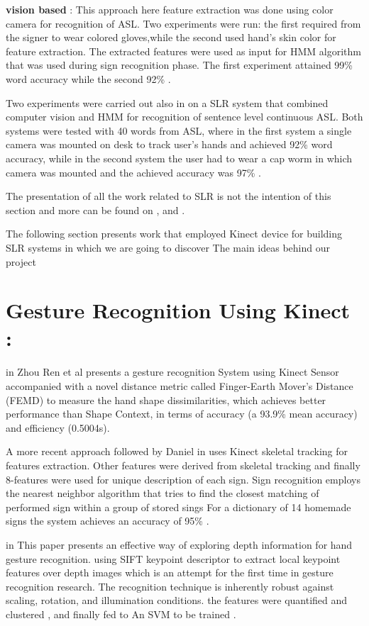 \textbf{vision based }:
This approach  \cite{32} here  feature extraction was done using color camera for recognition of ASL. Two experiments were run: the first required from the signer to wear colored gloves,while the second used hand’s skin color for feature extraction\cite{32}. The extracted features were used as input for HMM algorithm that was used during sign recognition phase. The first experiment attained 99\% word accuracy while the second 92\%  .
 
Two experiments were carried out also in \cite{33} on a SLR system that combined computer vision and HMM for recognition of sentence level continuous ASL. Both systems were tested with 40 words from ASL, where in the first system a single camera was mounted on desk to track user’s hands and achieved 92\% word accuracy, while in the second system the user had to wear a cap worm in which camera was mounted and the achieved accuracy was 97\%  \cite{33}.



The presentation of all the work related to SLR is not the intention of this section and more can be found on  \cite{27},\cite{36} and \cite{39}. 

The following section presents work that employed Kinect device for building SLR systems in which we are going to discover The main ideas behind our project 

\section{Gesture Recognition Using Kinect :}

in \cite{35} Zhou Ren et al presents a gesture recognition System using Kinect Sensor accompanied with a novel distance metric called Finger-Earth Mover’s Distance (FEMD) to measure the hand shape dissimilarities, which achieves better performance than Shape Context, in terms of accuracy (a 93.9\% mean accuracy) and efficiency (0.5004s). 

A more recent approach followed by Daniel in \cite{47} uses Kinect skeletal tracking for features extraction. Other features were derived from skeletal tracking and finally 8-features were used for unique description of each sign. Sign recognition employs the nearest neighbor algorithm that tries to find the closest matching of performed sign within a group of stored sings  For a dictionary of 14 homemade signs the system achieves an accuracy of 95\% \cite{47} . 

in \cite{dardas} This paper presents an effective way of exploring depth information for hand gesture recognition. using  SIFT keypoint descriptor to extract local keypoint features over depth images which is an attempt for the first time in gesture recognition research. The recognition technique is inherently robust against scaling, rotation, and illumination conditions.  the features were  quantified  and clustered , and finally fed to  An SVM to be trained .\\


